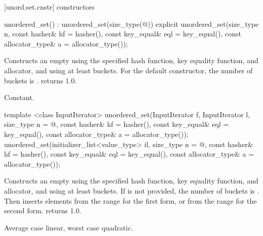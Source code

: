 [unord.set.cnstr]{ constructors}

%
\begin{itemdecl}
unordered_set() : unordered_set(size_type(@\seebelow@)) { }
explicit unordered_set(size_type n,
                       const hasher& hf = hasher(),
                       const key_equal& eql = key_equal(),
                       const allocator_type& a = allocator_type());
\end{itemdecl}

\begin{itemdescr}
\pnum
\effects Constructs an empty  using the
specified hash function, key equality function, and allocator, and
using at least  buckets.  For the default constructor,
the number of buckets is .   returns 1.0.

\pnum
\complexity Constant.
\end{itemdescr}

%
\begin{itemdecl}
template <class InputIterator>
  unordered_set(InputIterator f, InputIterator l,
                size_type n = @\seebelow@,
                const hasher& hf = hasher(),
                const key_equal& eql = key_equal(),
                const allocator_type& a = allocator_type());
unordered_set(initializer_list<value_type> il,
              size_type n = @\seebelow@,
              const hasher& hf = hasher(),
              const key_equal& eql = key_equal(),
              const allocator_type& a = allocator_type());
\end{itemdecl}

\begin{itemdescr}
\pnum
\effects Constructs an empty  using the
specified hash function, key equality function, and allocator, and
using at least  buckets. If  is not
provided, the number of buckets is . Then
inserts elements from the range 
for the first form, or from the range 
 for the second form.
 returns 1.0.

\pnum
\complexity Average case linear, worst case quadratic.
\end{itemdescr}

